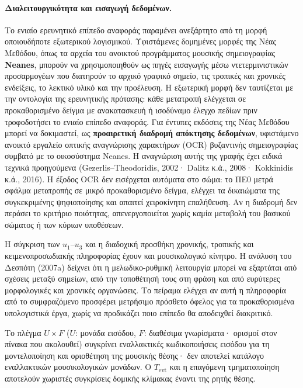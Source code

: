 \documentclass[11pt,a4paper]{article}
\begin{document}
\paragraph{Διαλειτουργικότητα και εισαγωγή δεδομένων.}
Το ενιαίο ερευνητικό επίπεδο αναφοράς παραμένει ανεξάρτητο από τη μορφή οποιουδήποτε εξωτερικού λογισμικού. Υφιστάμενες δομημένες μορφές της Νέας Μεθόδου, όπως τα αρχεία του ανοικτού προγράμματος μουσικής σημειογραφίας \textbf{Neanes}, μπορούν να χρησιμοποιηθούν ως πηγές εισαγωγής μέσω ντετερμινιστικών προσαρμογέων που διατηρούν το αρχικό γραφικό σημείο, τις τροπικές και χρονικές ενδείξεις, το λεκτικό υλικό και την προέλευση. Η εξωτερική μορφή δεν ταυτίζεται με την οντολογία της ερευνητικής πρότασης: κάθε μετατροπή ελέγχεται σε προκαθορισμένο δείγμα με ανακατασκευή ή ισοδύναμο έλεγχο πεδίων πριν τροφοδοτήσει το ενιαίο επίπεδο αναφοράς. Για έντυπες εκδόσεις της Νέας Μεθόδου μπορεί να δοκιμαστεί, ως \textbf{προαιρετική διαδρομή απόκτησης δεδομένων}, υφιστάμενο ανοικτό εργαλείο οπτικής αναγνώρισης χαρακτήρων (OCR) βυζαντινής σημειογραφίας συμβατό με το οικοσύστημα Neanes. Η αναγνώριση αυτής της γραφής έχει ειδικά τεχνικά προηγούμενα (Gezerlis--Theodoridis, 2002· Dalitz κ.ά., 2008· Kokkinidis κ.ά., 2016). Η έξοδος OCR δεν εισέρχεται αυτόματα στο σώμα: το ΠΕ0 μετρά σφάλμα μετατροπής σε μικρό προκαθορισμένο δείγμα, ελέγχει τα δικαιώματα της συγκεκριμένης ψηφιοποίησης και απαιτεί χειροκίνητη επαλήθευση. Αν η διαδρομή δεν περάσει το κριτήριο ποιότητας, απενεργοποιείται χωρίς καμία μεταβολή του βασικού σώματος ή των κύριων υποθέσεων.

Η σύγκριση των $u_1$--$u_3$ και η διαδοχική προσθήκη χρονικής, τροπικής και κειμενοπροσωδιακής πληροφορίας έχουν και μουσικολογικό κίνητρο. Η ανάλυση του Δεσπότη (2007a) δείχνει ότι η μελωδικο-ρυθμική λειτουργία μπορεί να εξαρτάται από σχέσεις μεταξύ σημείων, από την τοποθέτησή τους στη φράση και από ευρύτερες μορφολογικές και χρονικές οργανώσεις. Το πείραμα ελέγχει αν αυτή η πληροφορία από το συμφραζόμενο προσφέρει μετρήσιμο πρόσθετο όφελος για τα προκαθορισμένα υπολογιστικά έργα, χωρίς να προδικάζει ποιο επίπεδο θα αποδειχθεί διακριτικό.

Το πλέγμα $U\times F$ (\(U\): μονάδα εισόδου, \(F\): διαθέσιμα γνωρίσματα· ορισμοί στον πίνακα που ακολουθεί) συγκρίνει εναλλακτικές κωδικοποιήσεις εισόδου για τη μοντελοποίηση και οριοθέτηση της μουσικής θέσης· δεν αποτελεί κατάλογο εναλλακτικών μουσικολογικών μονάδων. Ο $T_{\mathrm{evt}}$ και η επαγόμενη τμηματοποίηση αποτελούν χωριστές συγκρίσεις δομικής κλίμακας έναντι της ρητής θέσης.
\end{document}
